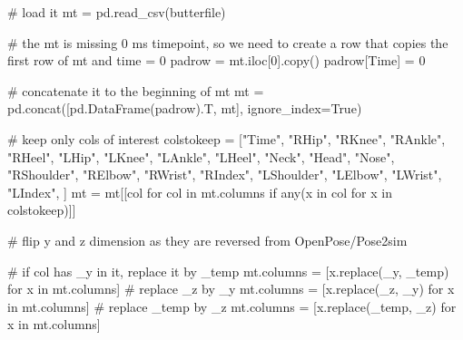 \documentclass[
  letterpaper,
  DIV=11,
  numbers=noendperiod]{scrreprt}
\newenvironment{Shaded}{\begin{snugshade}}{\end{snugshade}}
\newcommand{\BuiltInTok}[1]{\textcolor[rgb]{0.00,0.23,0.31}{#1}}
\newcommand{\CommentTok}[1]{\textcolor[rgb]{0.37,0.37,0.37}{#1}}
\newcommand{\ControlFlowTok}[1]{\textcolor[rgb]{0.00,0.23,0.31}{#1}}
\newcommand{\DecValTok}[1]{\textcolor[rgb]{0.68,0.00,0.00}{#1}}
\newcommand{\KeywordTok}[1]{\textcolor[rgb]{0.00,0.23,0.31}{#1}}
\newcommand{\NormalTok}[1]{\textcolor[rgb]{0.00,0.23,0.31}{#1}}
\newcommand{\OperatorTok}[1]{\textcolor[rgb]{0.37,0.37,0.37}{#1}}
\newcommand{\StringTok}[1]{\textcolor[rgb]{0.13,0.47,0.30}{#1}}
\newcommand{\VariableTok}[1]{\textcolor[rgb]{0.07,0.07,0.07}{#1}}
\begin{document}
\begin{Shaded}
\begin{Highlighting}[]
    \CommentTok{\# load it}
\NormalTok{    mt }\OperatorTok{=}\NormalTok{ pd.read\_csv(butterfile)}

    \CommentTok{\# the mt is missing 0 ms timepoint, so we need to create a row that copies the first row of mt and time = 0}
\NormalTok{    padrow }\OperatorTok{=}\NormalTok{ mt.iloc[}\DecValTok{0}\NormalTok{].copy()}
\NormalTok{    padrow[}\StringTok{\textquotesingle{}Time\textquotesingle{}}\NormalTok{] }\OperatorTok{=} \DecValTok{0}

    \CommentTok{\# concatenate it to the beginning of mt }
\NormalTok{    mt }\OperatorTok{=}\NormalTok{ pd.concat([pd.DataFrame(padrow).T, mt], ignore\_index}\OperatorTok{=}\VariableTok{True}\NormalTok{)}

    \CommentTok{\# keep only cols of interest}
\NormalTok{    colstokeep }\OperatorTok{=}\NormalTok{ [}\StringTok{"Time"}\NormalTok{, }\StringTok{"RHip"}\NormalTok{, }\StringTok{"RKnee"}\NormalTok{, }\StringTok{"RAnkle"}\NormalTok{, }\StringTok{"RHeel"}\NormalTok{, }\StringTok{"LHip"}\NormalTok{, }\StringTok{"LKnee"}\NormalTok{, }\StringTok{"LAnkle"}\NormalTok{, }\StringTok{"LHeel"}\NormalTok{, }\StringTok{"Neck"}\NormalTok{, }\StringTok{"Head"}\NormalTok{, }\StringTok{"Nose"}\NormalTok{, }\StringTok{"RShoulder"}\NormalTok{, }\StringTok{"RElbow"}\NormalTok{, }\StringTok{"RWrist"}\NormalTok{, }\StringTok{"RIndex"}\NormalTok{, }\StringTok{"LShoulder"}\NormalTok{, }\StringTok{"LElbow"}\NormalTok{, }\StringTok{"LWrist"}\NormalTok{,}
    \StringTok{"LIndex"}\NormalTok{,}
\NormalTok{]}
\NormalTok{    mt }\OperatorTok{=}\NormalTok{ mt[[col }\ControlFlowTok{for}\NormalTok{ col }\KeywordTok{in}\NormalTok{ mt.columns }\ControlFlowTok{if} \BuiltInTok{any}\NormalTok{(x }\KeywordTok{in}\NormalTok{ col }\ControlFlowTok{for}\NormalTok{ x }\KeywordTok{in}\NormalTok{ colstokeep)]]}

    \CommentTok{\# flip y and z dimension as they are reversed from OpenPose/Pose2sim}

    \CommentTok{\# if col has \_y in it, replace it by \_temp}
\NormalTok{    mt.columns }\OperatorTok{=}\NormalTok{ [x.replace(}\StringTok{\textquotesingle{}\_y\textquotesingle{}}\NormalTok{, }\StringTok{\textquotesingle{}\_temp\textquotesingle{}}\NormalTok{) }\ControlFlowTok{for}\NormalTok{ x }\KeywordTok{in}\NormalTok{ mt.columns]}
    \CommentTok{\# replace \_z by \_y}
\NormalTok{    mt.columns }\OperatorTok{=}\NormalTok{ [x.replace(}\StringTok{\textquotesingle{}\_z\textquotesingle{}}\NormalTok{, }\StringTok{\textquotesingle{}\_y\textquotesingle{}}\NormalTok{) }\ControlFlowTok{for}\NormalTok{ x }\KeywordTok{in}\NormalTok{ mt.columns]}
    \CommentTok{\# replace \_temp by \_z}
\NormalTok{    mt.columns }\OperatorTok{=}\NormalTok{ [x.replace(}\StringTok{\textquotesingle{}\_temp\textquotesingle{}}\NormalTok{, }\StringTok{\textquotesingle{}\_z\textquotesingle{}}\NormalTok{) }\ControlFlowTok{for}\NormalTok{ x }\KeywordTok{in}\NormalTok{ mt.columns]}


\end{Highlighting}
\end{Shaded}
\end{document}
